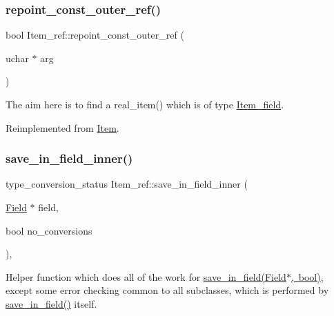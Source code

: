\mbox{\label{classItem__ref_a98be0fd1ea742321acff64b78c175468}} 
\subsubsection{\texorpdfstring{repoint\+\_\+const\+\_\+outer\+\_\+ref()}{repoint\_const\_outer\_ref()}}
{\footnotesize\ttfamily bool Item\+\_\+ref\+::repoint\+\_\+const\+\_\+outer\+\_\+ref (\begin{DoxyParamCaption}\item[{uchar $\ast$}]{arg }\end{DoxyParamCaption})\hspace{0.3cm}{\ttfamily [virtual]}}

The aim here is to find a real\+\_\+item() which is of type \mbox{\hyperlink{classItem__field}{Item\+\_\+field}}. 

Reimplemented from \mbox{\hyperlink{classItem_a8deff5e761c2a4fc89e60df1389da969}{Item}}.

\mbox{\label{classItem__ref_a08a7488069b002097708079cd73e84fb}} 
\subsubsection{\texorpdfstring{save\+\_\+in\+\_\+field\+\_\+inner()}{save\_in\_field\_inner()}}
{\footnotesize\ttfamily type\+\_\+conversion\+\_\+status Item\+\_\+ref\+::save\+\_\+in\+\_\+field\+\_\+inner (\begin{DoxyParamCaption}\item[{\mbox{\hyperlink{classField}{Field}} $\ast$}]{field,  }\item[{bool}]{no\+\_\+conversions }\end{DoxyParamCaption})\hspace{0.3cm}{\ttfamily [protected]}, {\ttfamily [virtual]}}

Helper function which does all of the work for \mbox{\hyperlink{classItem_acf4c1888a07e9e0dd5787283c6569545}{save\+\_\+in\+\_\+field(\+Field$\ast$, bool)}}, except some error checking common to all subclasses, which is performed by \mbox{\hyperlink{classItem_acf4c1888a07e9e0dd5787283c6569545}{save\+\_\+in\+\_\+field()}} itself.

